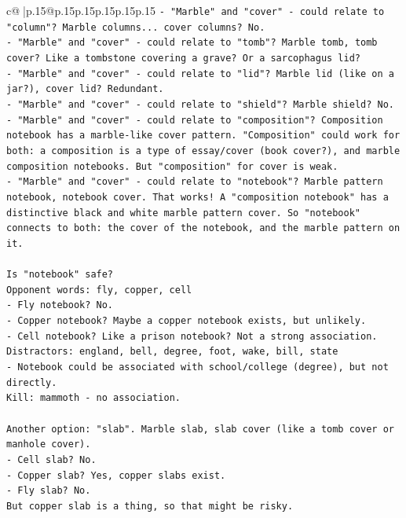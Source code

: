 \documentclass{article}
\begin{document}
{\begin{supertabular}{c@{$\;$}|p{.15\linewidth}@{}p{.15\linewidth}p{.15\linewidth}p{.15\linewidth}p{.15\linewidth}p{.15\linewidth}}
{{{\texttt{{-} "Marble" and "cover" {-} could relate to "column"? Marble columns... cover columns? No.} \\
\texttt{{-} "Marble" and "cover" {-} could relate to "tomb"? Marble tomb, tomb cover? Like a tombstone covering a grave? Or a sarcophagus lid?} \\
\texttt{{-} "Marble" and "cover" {-} could relate to "lid"? Marble lid (like on a jar?), cover lid? Redundant.} \\
\texttt{{-} "Marble" and "cover" {-} could relate to "shield"? Marble shield? No.} \\
\texttt{{-} "Marble" and "cover" {-} could relate to "composition"? Composition notebook has a marble{-}like cover pattern. "Composition" could work for both: a composition is a type of essay/cover (book cover?), and marble composition notebooks. But "composition" for cover is weak.} \\
\texttt{{-} "Marble" and "cover" {-} could relate to "notebook"? Marble pattern notebook, notebook cover. That works! A "composition notebook" has a distinctive black and white marble pattern cover. So "notebook" connects to both: the cover of the notebook, and the marble pattern on it.} \\
\\ 
\texttt{Is "notebook" safe?} \\
\texttt{Opponent words: fly, copper, cell} \\
\texttt{{-} Fly notebook? No.} \\
\texttt{{-} Copper notebook? Maybe a copper notebook exists, but unlikely.} \\
\texttt{{-} Cell notebook? Like a prison notebook? Not a strong association.} \\
\texttt{Distractors: england, bell, degree, foot, wake, bill, state} \\
\texttt{{-} Notebook could be associated with school/college (degree), but not directly.} \\
\texttt{Kill: mammoth {-} no association.} \\
\\ 
\texttt{Another option: "slab". Marble slab, slab cover (like a tomb cover or manhole cover).} \\
\texttt{{-} Cell slab? No.} \\
\texttt{{-} Copper slab? Yes, copper slabs exist.} \\
\texttt{{-} Fly slab? No.} \\
\texttt{But copper slab is a thing, so that might be risky.} \\
}}}
\end{supertabular}}
\end{document}
